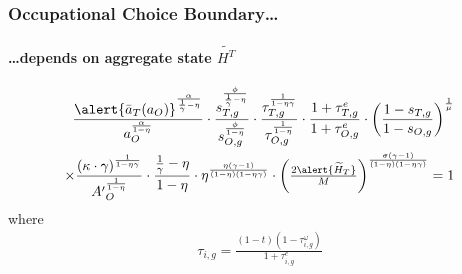 \documentclass[11pt]{beamer}
\begin{document}

\begin{frame}
\frametitle{Occupational Choice Boundary\ldots}
\framesubtitle{\ldots depends on aggregate state $\widetilde{H^T}$} 
\begin{align*}
	\frac{\alert{\bar{a}_T(a_O)}^\frac{\alpha}{\frac{1}{\gamma}-\eta}}{a_O^\frac{\alpha}{1-\eta}} \cdot \frac{s_{T,g}^\frac{\phi}{\frac{1}{\gamma}-\eta}}{s_{O,g}^\frac{\phi}{1-\eta}}\cdot \frac{\tau_{T,g}^\frac{1}{1-\eta\gamma}}{\tau_{O,g}^\frac{1}{1-\eta}} \cdot \frac{1+\tau^e_{T,g}}{1+\tau^e_{O,g}}\cdot \left(\frac{1-s_{T,g}}{1-s_{O,g}}\right)^\frac{1}{\mu} \nonumber\\
	\times \frac{\left(\kappa \cdot \gamma\right)^\frac{1}{1-\eta\gamma}}{{A'}_O^\frac{1}{1-\eta}} \cdot \frac{\frac{1}{\gamma}-\eta}{1-\eta}\cdot \eta^\frac{\eta(\gamma-1)}{(1-\eta)(1-\eta\gamma)} \cdot \left(\tfrac{2\alert{\widetilde{H}_T}}{M}\right)^{\frac{\sigma(\gamma-1)}{(1-\eta)(1-\eta\gamma)}}=1 \nonumber%
\end{align*}
where
\begin{align}
	\tau_{i,g} =\frac{(1-t)(1-\tau^{\omega}_{i,g})}{1+\tau^e_{i,g}} \nonumber
\end{align}
\end{frame}
\end{document}

